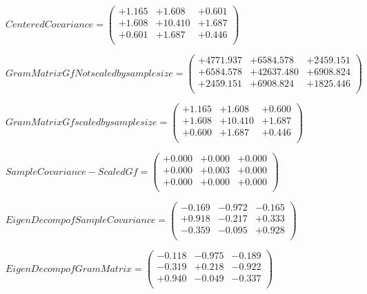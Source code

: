 \documentclass[9pt]{article}
\theoremstyle{plain}
\theoremstyle{definition}
\theoremstyle{remark}
\numberwithin{equation}{section}
\begin{document}
$Centered Covariance = \left(
\begin{array}{
ccc}
+1.165 & +1.608 & +0.601 \\
+1.608 & +10.410 & +1.687 \\
+0.601 & +1.687 & +0.446 \\
\end{array}
\right)$ \newline 

$Gram Matrix Gf Not scaled by sample size = \left(
\begin{array}{
ccc}
+4771.937 & +6584.578 & +2459.151 \\
+6584.578 & +42637.480 & +6908.824 \\
+2459.151 & +6908.824 & +1825.446 \\
\end{array}
\right)$ \newline 

$Gram Matrix Gf  scaled by sample size = \left(
\begin{array}{
ccc}
+1.165 & +1.608 & +0.600 \\
+1.608 & +10.410 & +1.687 \\
+0.600 & +1.687 & +0.446 \\
\end{array}
\right)$ \newline 

$SampleCovariance - Scaled Gf = \left(
\begin{array}{
ccc}
+0.000 & +0.000 & +0.000 \\
+0.000 & +0.003 & +0.000 \\
+0.000 & +0.000 & +0.000 \\
\end{array}
\right)$ \newline 

$EigenDecomp of SampleCovariance = \left(
\begin{array}{
ccc}
-0.169 & -0.972 & -0.165 \\
+0.918 & -0.217 & +0.333 \\
-0.359 & -0.095 & +0.928 \\
\end{array}
\right)$ \newline 

$EigenDecomp of Gram Matrix = \left(
\begin{array}{
ccc}
-0.118 & -0.975 & -0.189 \\
-0.319 & +0.218 & -0.922 \\
+0.940 & -0.049 & -0.337 \\
\end{array}
\right)$ \newline 
\end{document}
